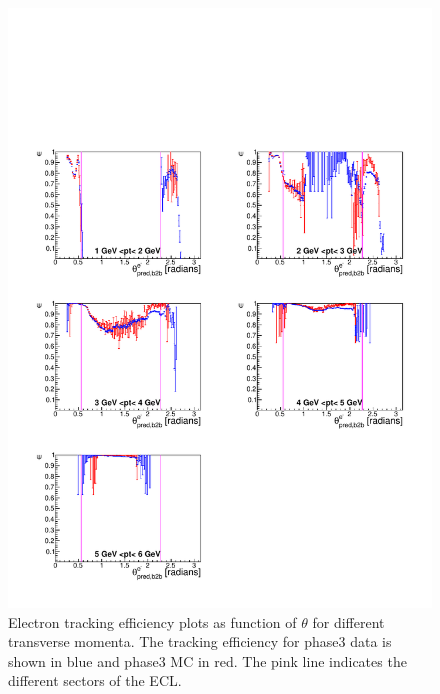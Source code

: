 \documentclass[a4paper,11pt,twosided,final,german,openbib,pdftex,listof=totoc,bibliography=totoc]{scrbook}
\begin{document}
\begin{figure}[!htbp]
	\centering
	\includegraphics[width=\textwidth]{Plots/master3/xPtMThetaemP3}
	\caption[Transverse Momentum $\theta$ Electron Efficiency Phase3]{Electron tracking efficiency plots as function of $\theta$ for different transverse momenta. The tracking efficiency for phase3 data is shown in blue and phase3 MC in red. The pink line indicates the different sectors of the ECL.}
	
	\label{plt:xPtMThetaem3}
\end{figure}
\end{document}
